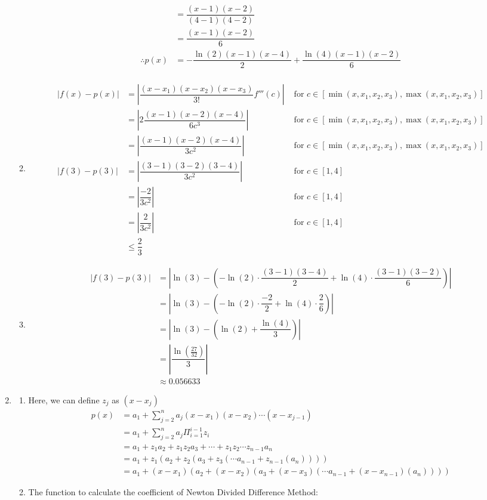 \documentclass{article}
\begin{document}
\begin{enumerate}
\begin{enumerate}
\begin{align*}
&=\dfrac{(x-1)(x-2)}{(4-1)(4-2)}\\
&=\dfrac{(x-1)(x-2)}{6}\\
\therefore p(x)&=-\dfrac{\ln(2)(x-1)(x-4)}{2}+\dfrac{\ln(4)(x-1)(x-2)}{6}\\
\end{align*}
\item
\begin{align*}
|f(x)-p(x)|&=\left|\dfrac{(x-x_1)(x-x_2)(x-x_3)}{3!}f'''(c)\right|&\mbox{ for } c \in [\min(x,x_1,x_2,x_3), \max(x,x_1,x_2,x_3)]\\
&= \left|2\dfrac{(x-1)(x-2)(x-4)}{6c^3}\right|&\mbox{ for } c \in [\min(x,x_1,x_2,x_3), \max(x,x_1,x_2,x_3)]\\
&= \left|\dfrac{(x-1)(x-2)(x-4)}{3c^2}\right|&\mbox{ for } c \in [\min(x,x_1,x_2,x_3), \max(x,x_1,x_2,x_3)]\\
|f(3)-p(3)|&= \left|\dfrac{(3-1)(3-2)(3-4)}{3c^2}\right|&\mbox{ for } c \in [1, 4]\\
&= \left|\dfrac{-2}{3c^2}\right|&\mbox{ for } c \in [1, 4]\\
&= \left|\dfrac{2}{3c^2}\right|&\mbox{ for } c \in [1, 4]\\
&\leq \dfrac{2}{3}
\end{align*}
\item
\begin{align*}
|f(3)-p(3)|&=\left|\ln(3)-\left(-\ln(2)\cdot\dfrac{(3-1)(3-4)}{2}+\ln(4)\cdot\dfrac{(3-1)(3-2)}{6}\right)\right|\\
&=\left|\ln(3)-\left(-\ln(2)\cdot\dfrac{-2}{2}+\ln(4)\cdot \dfrac{2}{6}\right)\right|\\
&=\left|\ln(3)-\left(\ln(2)+\dfrac{\ln(4)}{3}\right)\right|\\
&= \left|\dfrac{\ln(\frac{27}{32})}{3}\right|\\
&\approx 0.056633
\end{align*}
\end{enumerate}
\item
\begin{enumerate}
\item
Here, we can define $z_j$ as $(x-x_j)$ 
\begin{align*}
p(x)&=a_1+\sum_{j=2}^n a_j(x-x_1)(x-x_2)\cdots(x-x_{j-1})\\
&=a_1+\sum_{j=2}^n a_j\Pi_{i=1}^{i-1}z_i\\
&=a_1+z_1a_2+z_1z_2a_3+\cdots+z_1z_2\cdots z_{n-1}a_n\\
&=a_1+z_1(a_2+ z_2(a_3+ z_3(\cdots a_{n-1}+z_{n-1}(a_n))))\\
&=a_1+(x-x_1)(a_2+ (x-x_2)(a_3+ (x-x_3)(\cdots a_{n-1}+(x-x_{n-1})(a_n))))
\end{align*}
\item
The function to calculate the coefficient of Newton Divided Difference Method: 
 

\end{enumerate}
\end{enumerate}
\end{document}
